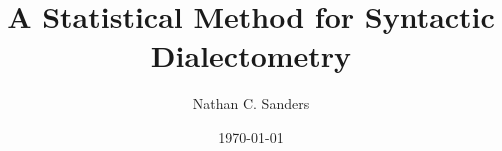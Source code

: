 \documentclass[10pt]{report}
\begin{document}
\title{A Statistical Method for Syntactic Dialectometry}
\author{Nathan C. Sanders}
\date{\today}



\beforepreface
\afterpreface















%
%

\small\normalsize
\newpage
\vitapage
\end{document}
